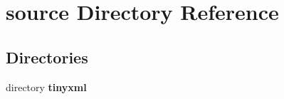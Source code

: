 \section{source Directory Reference}
\label{dir_b2f33c71d4aa5e7af42a1ca61ff5af1b}
\subsection*{Directories}
\begin{DoxyCompactItemize}
\item 
directory \textbf{ tinyxml}
\end{DoxyCompactItemize}
